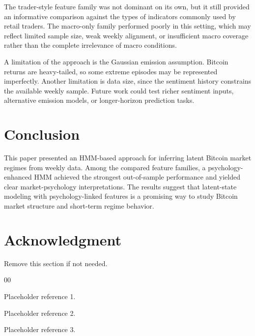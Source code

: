 \documentclass[conference]{IEEEtran}
\begin{document}
The trader-style feature family was not dominant on its own, but it still provided an informative comparison against the types of indicators commonly used by retail traders. The macro-only family performed poorly in this setting, which may reflect limited sample size, weak weekly alignment, or insufficient macro coverage rather than the complete irrelevance of macro conditions.

A limitation of the approach is the Gaussian emission assumption. Bitcoin returns are heavy-tailed, so some extreme episodes may be represented imperfectly. Another limitation is data size, since the sentiment history constrains the available weekly sample. Future work could test richer sentiment inputs, alternative emission models, or longer-horizon prediction tasks.

\section{Conclusion}
This paper presented an HMM-based approach for inferring latent Bitcoin market regimes from weekly data. Among the compared feature families, a psychology-enhanced HMM achieved the strongest out-of-sample performance and yielded clear market-psychology interpretations. The results suggest that latent-state modeling with psychology-linked features is a promising way to study Bitcoin market structure and short-term regime behavior.

\section*{Acknowledgment}
Remove this section if not needed.

\begin{thebibliography}{00}

Placeholder reference 1.

Placeholder reference 2.

Placeholder reference 3.

\end{thebibliography}
\end{document}
